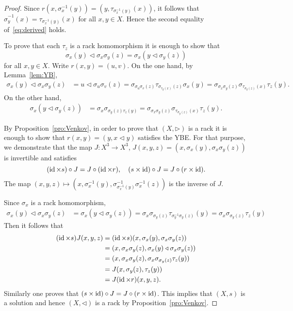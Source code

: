 \begin{proof}
    Since $r(x,\sigma_x^{-1}(y))=(y,\tau_{\sigma_x^{-1}(y)}(x))$, 
    it follows that 
    $\widehat{\sigma}_y^{-1}(x)=\tau_{\sigma_x^{-1}(y)}(x)$ 
    for all $x,y\in X$. Hence the second equality of~\eqref{eq:derived} holds. 
    
    To prove that each $\tau_z$ is a rack homomorphism it is enough to show that
    \[
    \sigma_x(y)\triangleleft \sigma_x\sigma_y(z)=\sigma_x(y\triangleleft\sigma_y(z))
    \]
    for all $x,y\in X$. Write $r(x,y)=(u,v)$. On the one hand, by 
    Lemma~\ref{lem:YB}, 
    \begin{align*}
        \sigma_x(y)\triangleleft \sigma_x\sigma_y(z)
        &=u\triangleleft \sigma_u\sigma_v(z)
        =\sigma_{\sigma_u\sigma_v(z)}\tau_{\sigma_{\tau_y(x)}(z)}\sigma_x(y)
        =\sigma_{\sigma_x\sigma_y(z)}\sigma_{\tau_{\sigma_y(z)}(x)}\tau_z(y).
    \end{align*}
    On the other hand, 
    \begin{align*}
        \sigma_x(y\triangleleft\sigma_y(z)) 
        &=\sigma_x\sigma_{\sigma_y(z)\tau_z(y)}
        =\sigma_{\sigma_x\sigma_y(z)}\sigma_{\tau_{\sigma_y(z)}(x)}\tau_z(y).
    \end{align*}
    
    By Proposition~\ref{pro:Venkov}, in order to prove that $(X,\triangleright)$ is a rack it is enough to show that
    $r(x,y)=(y,x\triangleleft y)$ satisfies the YBE. For that purpose, we demonstrate that 
    the map $J\colon X^3\to X^3$, $J(x,y,z)=(x,\sigma_x(y),\sigma_x\sigma_y(z))$ 
    is invertible and 
    satisfies 
    \[
    (\operatorname{id}\times s)\circ J=J\circ(\operatorname{id}\times r),
    \quad
    (s\times\operatorname{id})\circ J=J\circ(r\times\operatorname{id}).
    \]
    The map $(x,y,z)\mapsto (x,\sigma_x^{-1}(y),\sigma_{\sigma_x^{-1}(y)}^{-1}\sigma_x^{-1}(z))$ is the inverse of $J$. 

    Since $\sigma_x$ is a rack homomorphism, 
    \begin{align*}
    \sigma_x(y)\triangleleft \sigma_x\sigma_y(z)
    &=\sigma_x(y\triangleleft \sigma_y(z))
    =\sigma_x\sigma_{\sigma_y(z)}\tau_{\sigma_y^{-1}\sigma_y(z)}(y)
    =\sigma_x\sigma_{\sigma_y(z)}\tau_z(y)
    \end{align*}
    Then it follows that 
    \begin{align*}
        (\operatorname{id}\times s)J(x,y,z)
        &=(\operatorname{id}\times s)(x,\sigma_x(y),\sigma_x\sigma_y(z))\\
        &=(x,\sigma_x\sigma_y(z),\sigma_x(y)\triangleleft \sigma_x\sigma_y(z))\\
        &=(x,\sigma_x\sigma_y(z),\sigma_x\sigma_{\sigma_y(z)}\tau_z(y))\\
        &=J(x,\sigma_y(z),\tau_z(y))\\
        &=J(\operatorname{id}\times r)(x,y,z).
    \end{align*}
    Similarly one proves that $(s\times\operatorname{id})\circ J=J\circ (r\times\operatorname{id})$.  
    This implies that $(X,s)$ is a solution and 
    hence $(X,\triangleleft)$ is a rack by Proposition~\ref{pro:Venkov}. 


\end{proof}
